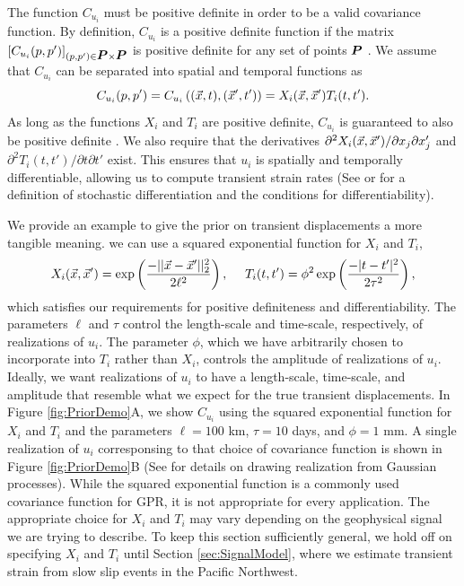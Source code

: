 \documentclass[extra,mreferee]{gji}
\begin{document}

The function $C_{u_i}$ must be positive definite in order to be a
valid covariance function. By definition, $C_{u_i}$ is a positive
definite function if the matrix $[C_{u_i}(p,p')]_{(p,p') \in \points
\times \points}$ is positive definite for any set of points $\points$
\citep[sec. 2.5]{Cressie1992}. We assume that $C_{u_i}$ can be
separated into spatial and temporal functions as
\begin{equation}\label{eq:TransientCovariance}
C_{u_i}(p,p') = C_{u_i}\left((\vec{x},t),(\vec{x}',t')\right) 
              = X_i(\vec{x},\vec{x}')T_i(t,t').
\end{equation}   
As long as the functions $X_i$ and $T_i$ are positive definite,
$C_{u_i}$ is guaranteed to also be positive definite \citep[sec.
4.2.4]{Rasmussen2006}. We also require that the derivatives
$\partial^2 X_i(\vec{x},\vec{x}')/ \partial x_j \partial x_j'$ and
$\partial^2 T_i(t,t') / \partial t \partial t'$ exist. This ensures
that $u_i$ is spatially and temporally differentiable, allowing us to
compute transient strain rates (See \citet[sec. 2.2]{Adler1981} or
\citet[sec. 10A]{Papoulis1991} for a definition of stochastic
differentiation and the conditions for differentiability).


We provide an example to give the prior on transient displacements a
more tangible meaning. we can use a squared exponential function for
$X_i$ and $T_i$,
\begin{equation}\label{eq:ExampleCov}
X_i(\pos,\pos') = \exp\left(\frac{-||\pos - \pos'||_2^2}{2\ell^2}\right), \ \ \ \ 
T_i(t,t') = \phi^2 \exp\left(\frac{-|t - t'|^2}{2\tau^2}\right),
\end{equation}
which satisfies our requirements for positive definiteness and
differentiability. The parameters $\ell$ and $\tau$ control the
length-scale and time-scale, respectively, of realizations of $u_i$.
The parameter $\phi$, which we have arbitrarily chosen to incorporate
into $T_i$ rather than $X_i$, controls the amplitude of realizations
of $u_i$. Ideally, we want realizations of $u_i$ to have a
length-scale, time-scale, and amplitude that resemble what we expect
for the true transient displacements. In Figure \ref{fig:PriorDemo}A,
we show $C_{u_i}$ using the squared exponential function for $X_i$ and
$T_i$ and the parameters $\ell = 100$ km, $\tau = 10$ days, and $\phi
= 1$ mm. A single realization of $u_i$ corresponsing to that choice of
covariance function is shown in Figure \ref{fig:PriorDemo}B (See
\citet[sec. A3]{Rasmussen2006} for details on drawing realization from
Gaussian processes). While the squared exponential function is a
commonly used covariance function for GPR, it is not appropriate for
every application. The appropriate choice for $X_i$ and $T_i$ may vary
depending on the geophysical signal we are trying to describe. To keep
this section sufficiently general, we hold off on specifying $X_i$ and
$T_i$ until Section \ref{sec:SignalModel}, where we estimate transient
strain from slow slip events in the Pacific Northwest.
\end{document}
